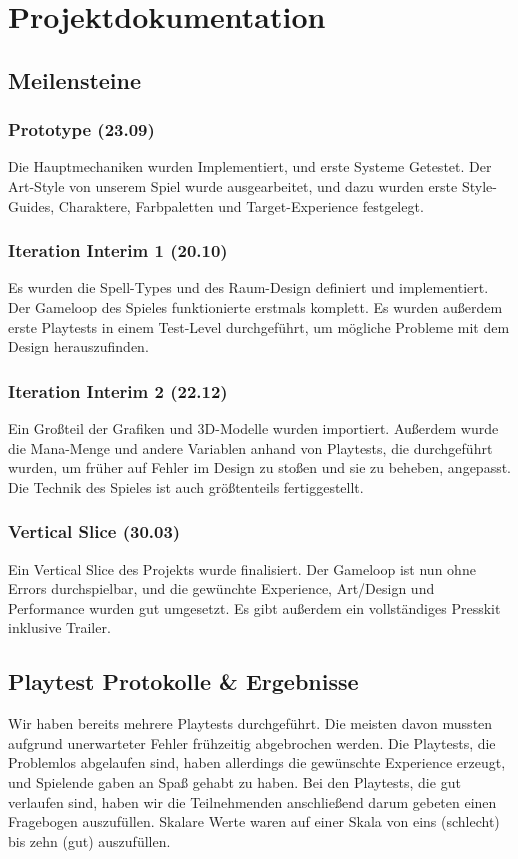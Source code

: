 \chapter{Projektdokumentation}

\section{Meilensteine}

\subsection{Prototype (23.09)}
Die Hauptmechaniken wurden Implementiert, und erste Systeme Getestet. Der Art-Style von unserem Spiel wurde ausgearbeitet, und dazu wurden erste Style-Guides, Charaktere, Farbpaletten und Target-Experience festgelegt.

\subsection{Iteration Interim 1 (20.10)}
Es wurden die Spell-Types und des Raum-Design definiert und implementiert. Der Gameloop des Spieles funktionierte erstmals komplett. Es wurden außerdem erste Playtests in einem Test-Level durchgeführt, um mögliche Probleme mit dem Design herauszufinden.

\subsection{Iteration Interim 2 (22.12)}
Ein Großteil der Grafiken und 3D-Modelle wurden importiert. Außerdem wurde die Mana-Menge und andere Variablen anhand von Playtests, die durchgeführt wurden, um früher auf Fehler im Design zu stoßen und sie zu beheben, angepasst. Die Technik des Spieles ist auch größtenteils fertiggestellt.

\subsection{Vertical Slice (30.03)}
Ein Vertical Slice des Projekts wurde finalisiert. Der Gameloop ist nun ohne Errors durchspielbar, und die gewünchte Experience, Art/Design und Performance wurden gut umgesetzt. Es gibt außerdem ein vollständiges Presskit inklusive Trailer.

\section{Playtest Protokolle \& Ergebnisse}
Wir haben bereits mehrere Playtests durchgeführt. Die meisten davon mussten aufgrund unerwarteter Fehler frühzeitig abgebrochen werden. Die Playtests, die Problemlos abgelaufen sind, haben allerdings die gewünschte Experience erzeugt, und Spielende gaben an Spaß gehabt zu haben. Bei den Playtests, die gut verlaufen sind, haben wir die Teilnehmenden anschließend darum gebeten einen Fragebogen auszufüllen. Skalare Werte waren auf einer Skala von eins (schlecht) bis zehn (gut) auszufüllen.

